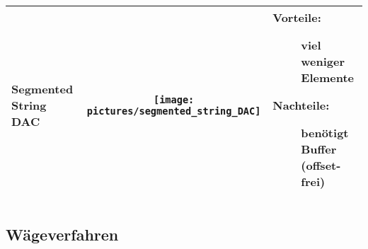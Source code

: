 \begin{tabular}{|>{\bfseries}p{3cm}|c|p{6.6cm}|}
	\\ \hline
	Segmented String DAC \hartl{459}
	& \texttt{[image: pictures/segmented\_string\_DAC]}
	& \begin{description}
  		\item[Vorteile: ] viel weniger Elemente
  		\item[Nachteile:] benötigt Buffer (offset-frei)
	  \end{description}
	\\ \hline
\end{tabular}
\renewcommand{\arraystretch}{\arraystretchOriginal}


\subsection{Wägeverfahren} 
